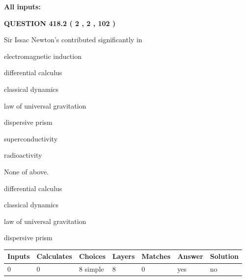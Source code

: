 \documentclass[12pt]{article}
\begin{document}
   
\noindent\vspace{0.1in}\hspace{-0.08in} {\textbf{\Large{All inputs: }}}
   
   
  
\vspace{0.2in}
  
{\textbf{\Large{QUESTION
418.2 
 ( 2 , 2 , 102 )
}}}
  
  
Sir Issac Newton's contributed significantly in
 
 
electromagnetic induction
 
 
differential calculus
 
 
classical dynamics
 
 
law of universal gravitation
 
 
dispersive prism
 
 
superconductivity
 
 
radioactivity
 
 
 None of above.
 
 
\noindent{}
 
 
differential calculus
 
 
classical dynamics
 
 
law of universal gravitation
 
 
dispersive prism
 
 
\noindent{}
 
 
   
   
   
   
\noindent\begin{tabular}{|l|l|l|l|l|l|l|}
 \hline
Inputs & Calculates & Choices & Layers & Matches & Answer & Solution \\ \hline
 0  & 
 0  & 
 8
  simple  
  & 
 8  & 
 0  & 
  yes & 
  no 
  \\ \hline
 \end{tabular}
   
   
   
   
\noindent{}
   
\end{document}
